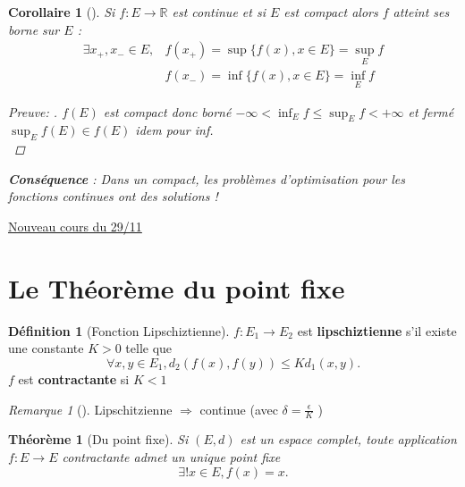 \documentclass{article}
\theoremstyle{plain}%
\newtheorem{thm}{Théorème}[section]
\newtheorem*{cor}{Corollaire}
\theoremstyle{definition}
\newtheorem{defn}{Définition}[section]
\theoremstyle{remark}
\newtheorem*{rem}{Remarque}
\begin{document}
\begin{cor}[]
    Si $ f: E \to \mathbb{R} $ est continue et si $ E $ est compact alors $ f $ atteint ses borne sur $ E $ :
    \begin{align*}
        \exists x_+ , x_- \in E, & f(x_+) = \sup \{f(x), x \in E\} = \sup _E f\\
            & f(x_-) = \inf \{f(x), x \in E\} = \inf _E f 
    \end{align*}

    \begin{proof}[Preuve: ]
        $ f(E) $ est compact donc borné $ -\infty < \inf _E f \leq \sup _E f < +\infty  $ et fermé $ \sup _E f(E) \in f(E) $ idem pour inf. \\
    \end{proof}
    
    \textbf{Conséquence} : Dans un compact, les problèmes d'optimisation pour les fonctions continues ont des solutions ! 
\end{cor}

\underline{Nouveau cours du 29/11} \\

\section{Le Théorème du point fixe}

\begin{defn}[Fonction Lipschiztienne]
    $ f: E_1 \to E_2 $ est \textbf{lipschiztienne} s'il existe une constante $ K > 0 $ telle que 
    \[
        \forall x,y \in E_1, d_2(f(x), f(y)) \leq K d_1(x,y)
    .\]
    $ f $ est \textbf{contractante} si $ K < 1 $ 
\end{defn}
\begin{rem}[]
    Lipschitzienne $ \Rightarrow  $ continue (avec $ \delta = \frac{\epsilon }{K} $ )
\end{rem}

\begin{thm}[Du point fixe]
    Si $ (E,d) $ est un espace complet, toute application $ f : E \to E $ contractante admet un unique point fixe 
    \[
        \exists ! x \in E, f(x) = x
    .\]
\end{thm}
\end{document}
